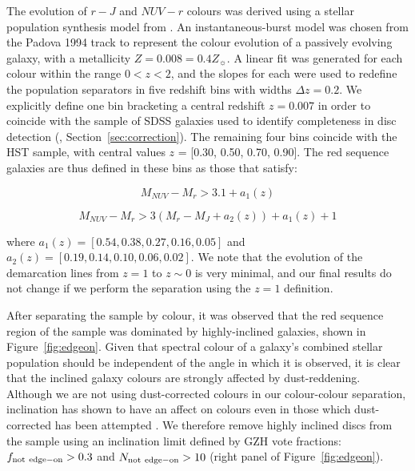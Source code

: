 \documentclass[useAMS,usenatbib]{mn2e}
\begin{document}
The evolution of $r-J$ and $NUV-r$ colours was derived using a stellar population synthesis model from \citet{Bruzual2003}. An instantaneous-burst model was chosen from the Padova 1994 track to represent the colour evolution of a passively evolving galaxy, with a metallicity $Z=0.008=0.4Z_{\sun}$. A linear fit was generated for each colour within the range $0<z<2$, and the slopes for each were used to redefine the population separators in five redshift bins with widths $\Delta z=0.2$. We explicitly define one bin bracketing a central redshift $z=0.007$ in order to coincide with the sample of SDSS galaxies used to identify completeness in disc detection (, Section~\ref{sec:correction}). The remaining four bins coincide with the HST sample, with central values $z$ = [0.30, 0.50, 0.70, 0.90]. The red sequence galaxies are thus defined in these bins as those that satisfy:

\begin{equation}
M_{NUV}-M_{r} > 3.1 + a_{1}(z)
\end{equation}

\begin{equation}
M_{NUV}-M_{r} > 3(M_{r}-M_{J} + a_{2}(z))+ a_{1}(z) + 1  
\end{equation}

\noindent where $a_{1}(z) = [0.54,0.38,0.27,0.16,0.05]$ and $a_{2}(z) = [0.19,0.14,0.10,0.06,0.02]$. 
We note that the evolution of the demarcation lines from $z=1$ to $z\sim0$ is very minimal, and our final results do not change if we perform the separation using the $z=1$ definition.

After separating the sample by colour, it was observed that the red sequence region of the sample was dominated by highly-inclined galaxies, shown in Figure~\ref{fig:edgeon}. Given that spectral colour of a galaxy's combined stellar population should be independent of the angle in which it is observed, it is clear that the inclined galaxy colours are strongly affected by dust-reddening. Although we are not using dust-corrected colours in our colour-colour separation, inclination has shown to have an affect on colours even in those which dust-corrected has been attempted \citep{Morselli2016a,Devour2017}. We therefore remove highly inclined discs from the sample using an inclination limit defined by GZH vote fractions: $f_{\rm not~edge-on} > 0.3$ and $N_{\rm not~edge-on}>10$ (right panel of Figure~\ref{fig:edgeon}).  
\end{document}
